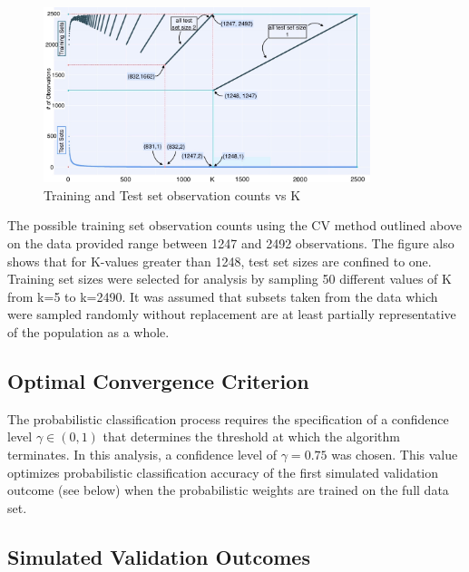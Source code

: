 \documentclass[12pt,]{article}
\begin{document}
\begin{figure}
\begin{center}
\includegraphics[width=0.85\textwidth]{KvsTrainlen.jpeg}
\caption[Figure 1:]{Training and Test set observation counts vs K}
\end{center}
\end{figure}

The possible training set observation counts using the CV method
outlined above on the data provided range between 1247 and 2492
observations. The figure also shows that for K-values greater than 1248,
test set sizes are confined to one. Training set sizes were selected for
analysis by sampling 50 different values of K from k=5 to k=2490. It was
assumed that subsets taken from the data which were sampled randomly
without replacement are at least partially representative of the
population as a whole.

\hypertarget{optimal-convergence-criterion}{%
\subsection{Optimal Convergence
Criterion}\label{optimal-convergence-criterion}}

The probabilistic classification process requires the specification of a
confidence level \(\gamma \in (0,1)\) that determines the threshold at
which the algorithm terminates. In this analysis, a confidence level of
\(\gamma=0.75\) was chosen. This value optimizes probabilistic
classification accuracy of the first simulated validation outcome (see
below) when the probabilistic weights are trained on the full data set.

\hypertarget{simulated-validation-outcomes}{%
\subsection{Simulated Validation
Outcomes}\label{simulated-validation-outcomes}}
\end{document}
